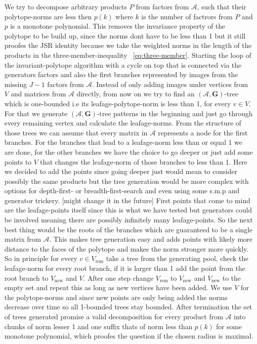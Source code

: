 We try to decompose arbitrary products $P$ from factors from $\mathcal{A}$, such that their polytope-norms are less then $p(k)$ where $k$ is the number of factrors from $P$ and $p$ is a monotone polynomial.
This removes the invariance property of the polytope to be build up, since the norms dont have to be less than 1 but it still proofes the JSR identity because we take the weighted norms in the length of the products in the three-member-inequality ~\ref{eq:three-member}.
\newline 
Starting the loop of the invariant-polytope algorithm with a cycle on top that is connected via the generators factors and also the first branches represented by images from the missing $J-1$ factors from $\mathcal{A}$. Instead of only adding images under vertices from $V$ and matrices from $\mathcal{A}$ directly, from now on we try to find an $(\mathcal{A},\mathbf{G})\text{-tree}$ which is one-bounded i.e its leafage-polytope-norm is less than 1, for every $v \in V$.
For that we generate $(\mathcal{A},\mathbf{G})\text{-tree}$ patterns in the beginning and just go through every remaining vertex and calculate the leafage-norms. From the structure of those trees we can assume that every matrix in $\mathcal{A}$ represents a node for the first branches.
For the branches that lead to a leafage-norm less than or equal 1 we are done, for the other branches we have the choice to go deeper or just add some points to $V$ that changes the leafage-norm of those branches to less than 1. Here we decided to add the points since going deeper just would mean to consider possibly the same products but the tree generation would be more complex with options for depth-first- or breadth-first-search and even using some s.m.p and generator trickery. [might change it in the future]
\newline
First points that come to mind are the leafage-points itself since this is what we have tested but generators could be involved meaning there are possibly infinitely many leafage-points. So the next best thing would be the roots of the branches which are guaranteed to be a single matrix from $\mathcal{A}$. This makes tree generation easy and adds points with likely more distance to the faces of the polytope and makes the norm stronger more quickly.
\newline
So in principle for every $v \in V_{\text{rem}}$ take a tree from the generating pool, check the leafage-norm for every root branch, if it is larger than 1 add the point from the root branch to $V_{\text{new}}$ and $V$. After one step change $V_{\text{rem}}$ to $V_{\text{new}}$ and $V_{\text{new}}$ to the empty set and repeat this as long as new vertices have been added. We use $V$ for the polytope-norms and since new points are only being added the norms decrease over time so all 1-bounded trees stay bounded.
\newline
After termination the set of trees generated promise a valid decomposition for every product from $\mathcal{A}$ into chunks of norm lesser 1 and one suffix thats of norm less than $p(k)$ for some monotone polynomial, which proofes the question if the chosen radius is maximal.

